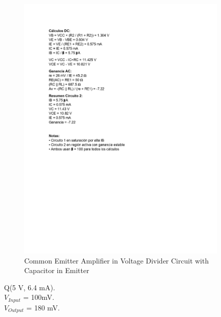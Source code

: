 \begin{figure}[H]
    \centering
    \includegraphics[width = 0.9\textwidth]{Imagenes/Imagenes_Santiago/BJT2.jpg}
    \caption{Common Emitter Amplifier in Voltage Divider Circuit with Capacitor in Emitter}
    \label{circuit1Teorico2}
\end{figure}

\begin{center}
    Q(5 V, 6.4 mA). \\
    \texorpdfstring{$V_{Input}$}{Vinput} = 100mV. \\
    \texorpdfstring{$V_{Output}$}{Voutput} = 180 mV.
\end{center}